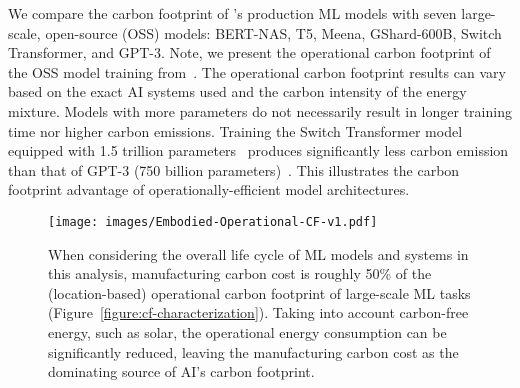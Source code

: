  We compare the carbon footprint of \fb's production ML models with seven large-scale, open-source (OSS) models: BERT-NAS, T5, Meena, GShard-600B, Switch Transformer, and GPT-3. 
 Note, we present the operational carbon footprint of the OSS model training from~\cite{Strubell:arxiv:2019,Patterson:arxiv:2021}. The operational carbon footprint results can vary based on the exact AI systems used and the carbon intensity of the energy mixture. Models with more parameters do not necessarily result in longer training time nor higher carbon emissions. Training the Switch Transformer model equipped with 1.5 trillion parameters~\cite{Fedus:switch-transformer:2021} produces significantly less carbon emission than that of GPT-3 (750 billion parameters)~\cite{brown:arxiv:2020}. This illustrates the carbon footprint advantage of operationally-efficient model architectures.
 
 \begin{figure}[t]
    \centering
    \texttt{[image: images/Embodied-Operational-CF-v1.pdf]}
    \caption{When considering the overall life cycle of ML models and systems in this analysis, manufacturing carbon cost is roughly 50\% of the (location-based) operational carbon footprint of large-scale ML tasks (Figure~\ref{figure:cf-characterization}). Taking into account carbon-free energy, such as solar, the operational energy consumption can be significantly reduced, leaving the manufacturing carbon cost as the dominating source of AI's carbon footprint.}
    \label{figure:ops-vs-embodied}
\end{figure}

